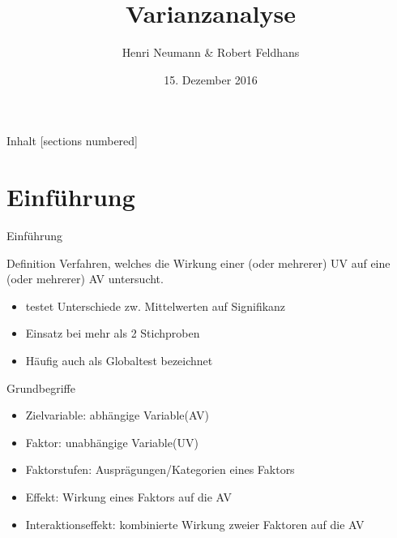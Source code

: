 \documentclass{beamer}
\title{Varianzanalyse}
\date{15. Dezember 2016}
\author{Henri Neumann \& Robert Feldhans}
\institute{Experimentelle Psychologie für Nichtpsychologen}
\begin{document}
	\maketitle
	
	\begin{frame}{Inhalt}
		[sections numbered]
		\tableofcontents[hideallsubsections]
	\end{frame}
	
	\section{Einführung}
	
	\begin{frame}{Einführung}
		
		\begin{block}{Definition}
			Verfahren, welches die Wirkung einer (oder mehrerer) UV auf eine (oder mehrerer) AV untersucht.
		\end{block}
		\begin{itemize}
			\item testet Unterschiede zw. Mittelwerten auf Signifikanz
			\item Einsatz bei mehr als 2 Stichproben
			\item Häufig auch als Globaltest bezeichnet
		\end{itemize}
		
	\end{frame}
	
	
	\begin{frame}{Grundbegriffe }
		\begin{itemize}
			\item Zielvariable: abhängige Variable(AV) 
			\item Faktor: unabhängige Variable(UV) 
			\item Faktorstufen: Ausprägungen/Kategorien eines Faktors 
			\item Effekt: Wirkung eines Faktors auf die AV
			\item Interaktionseffekt: kombinierte Wirkung zweier Faktoren auf die AV
		\end{itemize}
	\end{frame}
	
\end{document}
